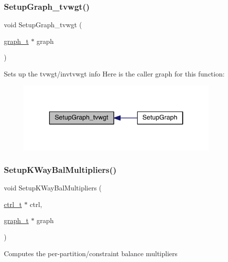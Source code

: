 \subsubsection{\texorpdfstring{Setup\+Graph\+\_\+tvwgt()}{SetupGraph\_tvwgt()}}
{\footnotesize\ttfamily void Setup\+Graph\+\_\+tvwgt (\begin{DoxyParamCaption}\item[{\hyperlink{a00734}{graph\+\_\+t} $\ast$}]{graph }\end{DoxyParamCaption})}

Set\textquotesingle{}s up the tvwgt/invtvwgt info Here is the caller graph for this function\+:\nopagebreak
\begin{figure}[H]
\begin{center}
\leavevmode
\includegraphics[width=286pt]{a00945_a274db8b39f4bc294fcb5757b01ae31f1_icgraph}
\end{center}
\end{figure}
\mbox{\label{a00945_a3444d1d3ffb5ca450a1affaeb6d71b61}} 
\subsubsection{\texorpdfstring{Setup\+K\+Way\+Bal\+Multipliers()}{SetupKWayBalMultipliers()}}
{\footnotesize\ttfamily void Setup\+K\+Way\+Bal\+Multipliers (\begin{DoxyParamCaption}\item[{\hyperlink{a00742}{ctrl\+\_\+t} $\ast$}]{ctrl,  }\item[{\hyperlink{a00734}{graph\+\_\+t} $\ast$}]{graph }\end{DoxyParamCaption})}

Computes the per-\/partition/constraint balance multipliers \mbox{\label{a00945_ad1dfd83fc2dc5e9f855c2d86b960c809}} 
